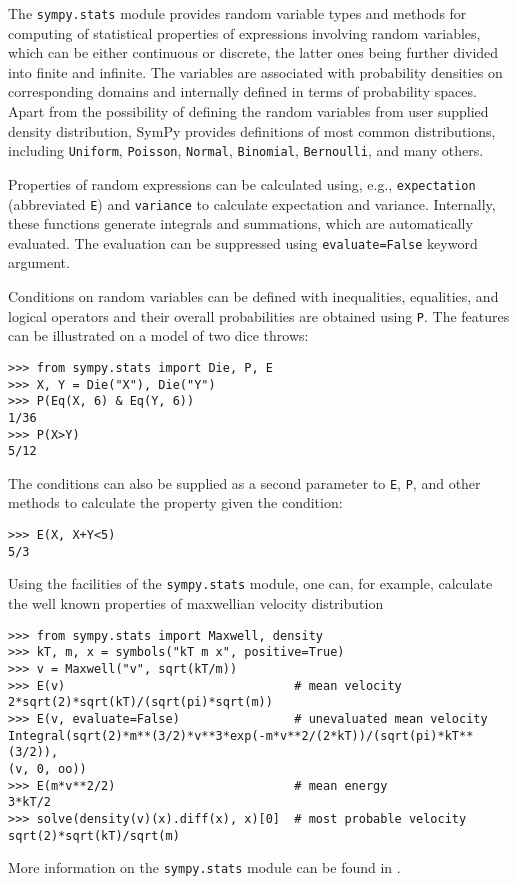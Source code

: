 The \verb|sympy.stats| module provides random variable types and methods for
computing of statistical properties of expressions involving random
variables, which can be either continuous or discrete, the latter ones being
further divided into finite and infinite. The variables are associated
with probability densities on corresponding domains and internally defined
in terms of probability spaces. 
Apart from the possibility of defining the random variables from user supplied
density distribution, SymPy provides definitions of most common
distributions, including \texttt{Uniform}, \texttt{Poisson}, \texttt{Normal},
\texttt{Binomial}, \texttt{Bernoulli}, and many others.

Properties of random expressions can be calculated using, e.g.,
\texttt{expectation} (abbreviated \texttt{E}) and \texttt{variance} to
calculate expectation and variance. Internally, these functions generate
integrals and summations, which are automatically evaluated. The evaluation
can be suppressed using \texttt{evaluate=False} keyword argument.

Conditions on random variables can be defined with inequalities, equalities,
and logical operators and their overall probabilities are obtained using
\texttt{P}. The features can be illustrated on a model of two dice throws:
\begin{verbatim}
>>> from sympy.stats import Die, P, E
>>> X, Y = Die("X"), Die("Y")
>>> P(Eq(X, 6) & Eq(Y, 6))
1/36
>>> P(X>Y)
5/12
\end{verbatim}
The conditions can also be supplied as a second parameter to \texttt{E},
\texttt{P}, and other methods to calculate the property given the condition:
\begin{verbatim}
>>> E(X, X+Y<5)
5/3
\end{verbatim}

Using the facilities of the \texttt{sympy.stats} module, one can, for
example, calculate 
the well known properties of maxwellian velocity distribution
\begin{verbatim}
>>> from sympy.stats import Maxwell, density
>>> kT, m, x = symbols("kT m x", positive=True)
>>> v = Maxwell("v", sqrt(kT/m))
>>> E(v)                                # mean velocity
2*sqrt(2)*sqrt(kT)/(sqrt(pi)*sqrt(m))
>>> E(v, evaluate=False)                # unevaluated mean velocity
Integral(sqrt(2)*m**(3/2)*v**3*exp(-m*v**2/(2*kT))/(sqrt(pi)*kT**(3/2)),
(v, 0, oo))
>>> E(m*v**2/2)                         # mean energy
3*kT/2
>>> solve(density(v)(x).diff(x), x)[0]  # most probable velocity
sqrt(2)*sqrt(kT)/sqrt(m)
\end{verbatim}

More information on the \texttt{sympy.stats} module can be found in
\cite{StatsMRocklin}.
